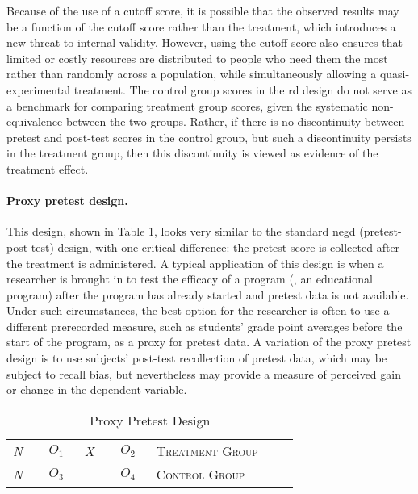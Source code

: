 Because of the use of a cutoff score, it is possible that the observed results may be a function of the cutoff score rather than the treatment, which introduces a new threat to internal validity. However, using the cutoff score also ensures that limited or costly resources are distributed to people who need them the most rather than randomly across a population, while simultaneously allowing a quasi-experimental treatment. The control group scores in the \gls{rd} design do not serve as a benchmark for comparing treatment group scores, given the systematic non-equivalence between the two groups. Rather, if there is no discontinuity between pretest and post-test scores in the control group, but such a discontinuity persists in the treatment group, then this discontinuity is viewed as evidence of the treatment effect.

\paragraph{Proxy pretest design.} This design, shown in Table \ref{09:tab11}, looks very similar to the standard \gls{negd} (pretest-post-test) design, with one critical difference: the pretest score is collected after the treatment is administered. A typical application of this design is when a researcher is brought in to test the efficacy of a program (\eg, an educational program) after the program has already started and pretest data is not available. Under such circumstances, the best option for the researcher is often to use a different prerecorded measure, such as students' grade point averages before the start of the program, as a proxy for pretest data. A variation of the proxy pretest design is to use subjects' post-test recollection of pretest data, which may be subject to recall bias, but nevertheless may provide a measure of perceived gain or change in the dependent variable.

\begin{table}[H]
	\centering
	\begin{tabularx}{0.85\linewidth}{p{0.10\linewidth}p{0.10\linewidth}p{0.10\linewidth}p{0.10\linewidth}p{0.40\linewidth}}
		\toprule
		\textit{N} & $ O_1 $ & \textit{X} & $ O_2 $ & \textsc{Treatment Group} \\
		\textit{N} & $ O_3 $ &            & $ O_4 $ & \textsc{Control Group} \\
		\bottomrule
	\end{tabularx}
	\caption{Proxy Pretest Design}
	\label{09:tab11}
\end{table}

